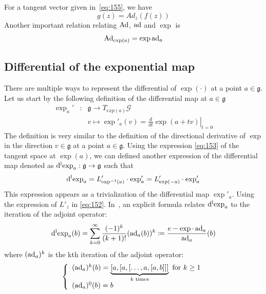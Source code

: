 For a tangent vector given in~\eqref{eq:155}, we have
\begin{equation}
  \label{eq:151}
  g(z) = Ad_z(f(z))
\end{equation}
Another important relation relating $\operatorname{Ad}$, $\operatorname{ad}$ and $\exp$ is
\begin{equation}
  \label{eq:164}
  \operatorname{Ad}_{\exp(a)} =\exp{\operatorname{ad}_a}
\end{equation}


\subsection{Differential of the exponential map} There are multiple ways to represent the differential of $\exp(\cdot)$ at a point $a\in \mathfrak g$. Let us start by the following definition of the differential map at $a\in\mathfrak g$
\begin{equation}
  \label{eq:147}
  \begin{array}{lcl}
    \exp_a' & : & \mathfrak g \rightarrow  T_{exp(a)}\mathcal G\\
            & &  v \mapsto \exp'_a(v)  = \left.\frac{d}{dt} \exp(a+tv)\right|_{t=0}
  \end{array}
\end{equation}
The definition is very similar to the definition of the directional derivative of $\exp$ in the direction $v \in \mathfrak g$ at a point $a\in\mathfrak g$. Using the expression \eqref{eq:153} of the tangent space at $\exp(a)$, we can defined another expression of the differential map denoted as $\operatorname{d^l exp}_a : \mathfrak g  \rightarrow \mathfrak g$ such that
\begin{equation}
  \label{eq:156}
  \operatorname{d^l exp}_a = L'_{\exp^{-1}(a)} \cdot \exp_a' = L'_{\exp(-a)} \cdot \exp_a'
\end{equation}
This expression appears as a trivialization of the differential map $\exp'_a$. Using the expression of $L'_z$ in \eqref{eq:152}.
In~\cite[Theorem 2.14.13]{Varadarajan_book1984}, an explicit formula relates $\operatorname{d^l exp}_{a}$ to the iteration of the adjoint operator:
\begin{equation}
  \label{eq:43}
  \operatorname{d^l exp}_a(b) = \sum_{k=0}^\infty \frac{(-1)^k}{(k+1)!} (\operatorname{ad}_a(b))^k \coloneqq \frac{e - \exp\cdot\operatorname{ad}_a}{\operatorname{ad}_a}(b)
\end{equation}
where $(\operatorname{ad}_a)^k$ is the kth iteration of the adjoint operator:
\begin{equation}
  \label{eq:44}
  \left\{\begin{array}[l]{l}
    (\ad_a)^k(b) = \underbrace{[a, [ a, [ \ldots, a, [ a, b]]]}_{k \text{ times}} \text{ for } k \geq 1 \\
    (\ad_a)^0(b)  = b
  \end{array}\right.
\end{equation}

